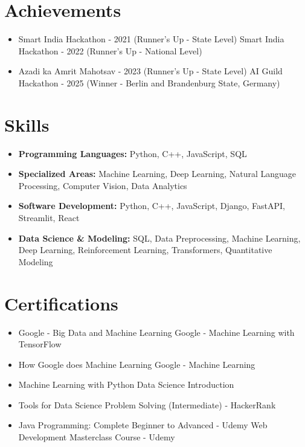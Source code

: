 \documentclass[a4paper,10pt]{article}
\begin{document}
\section*{Achievements}
\begin{itemize}
\item Smart India Hackathon - 2021 (Runner's Up - State Level) \hfill Smart India Hackathon - 2022 (Runner's Up - National Level)
\item Azadi ka Amrit Mahotsav - 2023 (Runner's Up - State Level) \hfill AI Guild Hackathon - 2025 (Winner - Berlin and Brandenburg State, Germany)
\end{itemize}

\section*{Skills}
\begin{itemize}
  \item \textbf{Programming Languages:} Python, C++, JavaScript, SQL
  \item \textbf{Specialized Areas:} Machine Learning, Deep Learning, Natural Language Processing, Computer Vision, Data Analytics
  \item \textbf{Software Development:} Python, C++, JavaScript, Django, FastAPI, Streamlit, React
  \item \textbf{Data Science \& Modeling:} SQL, Data Preprocessing, Machine Learning, Deep Learning, Reinforcement Learning, Transformers, Quantitative Modeling
\end{itemize}

\section*{Certifications}
\begin{itemize}
\item Google - Big Data and Machine Learning \hfill Google - Machine Learning with TensorFlow
\item How Google does Machine Learning \hfill Google - Machine Learning
\item Machine Learning with Python \hfill Data Science Introduction
\item Tools for Data Science \hfill Problem Solving (Intermediate) - HackerRank
\item Java Programming: Complete Beginner to Advanced - Udemy \hfill Web Development Masterclass Course - Udemy
\end{itemize}
\end{document}
